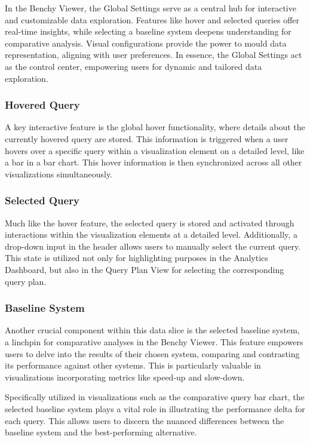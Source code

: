 In the Benchy Viewer, the Global Settings serve as a central hub for interactive and customizable data exploration. Features like hover and selected queries offer real-time insights, while selecting a baseline system deepens understanding for comparative analysis. Visual configurations provide the power to mould data representation, aligning with user preferences. In essence, the Global Settings act as the control center, empowering users for dynamic and tailored data exploration.

\subsubsection{Hovered Query}

A key interactive feature is the global hover functionality, where details about the currently hovered query are stored. This information is triggered when a user hovers over a specific query within a visualization element on a detailed level, like a bar in a bar chart. This hover information is then synchronized across all other visualizations simultaneously.

\subsubsection{Selected Query}

Much like the hover feature, the selected query is stored and activated through interactions within the visualization elements at a detailed level. Additionally, a drop-down input in the header allows users to manually select the current query. This state is utilized not only for highlighting purposes in the Analytics Dashboard, but also in the Query Plan View for selecting the corresponding query plan.

\subsubsection{Baseline System}

Another crucial component within this data slice is the selected baseline system, a linchpin for comparative analyses in the Benchy Viewer. This feature empowers users to delve into the results of their chosen system, comparing and contrasting its performance against other systems. This is particularly valuable in visualizations incorporating metrics like speed-up and slow-down.

Specifically utilized in visualizations such as the comparative query bar chart, the selected baseline system plays a vital role in illustrating the performance delta for each query. This allows users to discern the nuanced differences between the baseline system and the best-performing alternative. 

